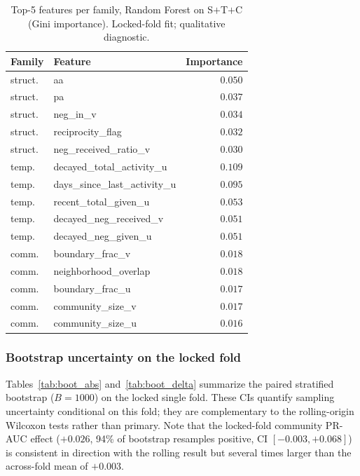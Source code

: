 \documentclass[conference]{IEEEtran}
\begin{document}
\begin{table}[t]
\caption{Top-5 features per family, Random Forest on S$+$T$+$C
(Gini importance). Locked-fold fit; qualitative diagnostic.}
\label{tab:imp_rf_topfam}
\centering
\small
\begin{tabular}{llr}
\toprule
Family & Feature & Importance \\
\midrule
struct.\ & aa                          & $0.050$ \\
struct.\ & pa                          & $0.037$ \\
struct.\ & neg\_in\_v                  & $0.034$ \\
struct.\ & reciprocity\_flag           & $0.032$ \\
struct.\ & neg\_received\_ratio\_v     & $0.030$ \\
\addlinespace
temp.\   & decayed\_total\_activity\_u & $0.109$ \\
temp.\   & days\_since\_last\_activity\_u & $0.095$ \\
temp.\   & recent\_total\_given\_u     & $0.053$ \\
temp.\   & decayed\_neg\_received\_v   & $0.051$ \\
temp.\   & decayed\_neg\_given\_u      & $0.051$ \\
\addlinespace
comm.\   & boundary\_frac\_v           & $0.018$ \\
comm.\   & neighborhood\_overlap       & $0.018$ \\
comm.\   & boundary\_frac\_u           & $0.017$ \\
comm.\   & community\_size\_v          & $0.017$ \\
comm.\   & community\_size\_u          & $0.016$ \\
\bottomrule
\end{tabular}
\end{table}

\subsubsection{Bootstrap uncertainty on the locked fold}
\label{sec:results:bootstrap}

Tables~\ref{tab:boot_abs} and~\ref{tab:boot_delta} summarize the
paired stratified bootstrap ($B = 1000$) on the locked single fold.
These CIs quantify sampling uncertainty conditional on this fold;
they are complementary to the rolling-origin Wilcoxon tests rather
than primary. Note that the locked-fold community PR-AUC effect
($+0.026$, 94\% of bootstrap resamples positive, CI
$[-0.003, +0.068]$) is consistent in direction with the rolling
result but several times larger than the across-fold mean of $+0.003$.
\end{document}
